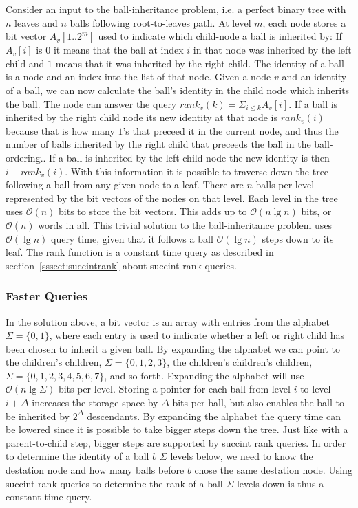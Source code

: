 Consider an input to the ball-inheritance problem, i.e. a perfect binary tree with $n$ leaves and $n$ balls following root-to-leaves path. At level $m$, each node stores a bit vector $A_v[1..2^m]$ used to indicate which child-node a ball is inherited by: If $A_v[i]$ is $0$ it means that the ball at index $i$ in that node was inherited by the left child and $1$ means that it was inherited by the right child. The identity of a ball is a node and an index into the list of that node. Given a node $v$ and an identity of a ball, we can now calculate the ball's identity in the child node which inherits the ball. The node can answer the query $rank_v(k) = \Sigma_{i \leq k} A_v[i]$. If a ball is inherited by the right child node its new identity at that node is $rank_v(i)$ because that is how many $1$'s that preceed it in the current node, and thus the number of balls inherited by the right child that preceeds the ball in the ball-ordering.. If a ball is inherited by the left child node the new identity is then $i-rank_v(i)$. With this information it is possible to traverse down the tree following a ball from any given node to a leaf. There are $n$ balls per level represented by the bit vectors of the nodes on that level. Each level in the tree uses $\mathcal{O}(n)$ bits to store the bit vectors. This adds up to $\mathcal{O}(n \lg n)$ bits, or $\mathcal{O}(n)$ words in all. This trivial solution to the ball-inheritance problem uses $\mathcal{O}(\lg n)$ query time, given that it follows a ball $\mathcal{O}(\lg n)$ steps down to its leaf. The rank function is a constant time query as described in section~\ref{sssect:succintrank} about succint rank queries.


\subsubsection{Faster Queries}
\label{ssection:fasterqueries}

In the solution above, a bit vector is an array with entries from the alphabet $\Sigma = \{0,1\}$, where each entry is used to indicate whether a left or right child has been chosen to inherit a given ball. By expanding the alphabet we can point to the children's children, $\Sigma = \{0,1,2,3\}$, the children's children's children, $\Sigma = \{0,1,2,3,4,5,6,7\}$, and so forth. Expanding the alphabet will use $\mathcal{O}(n \lg \Sigma)$ bits per level. Storing a pointer for each ball from level $i$ to level $i+\Delta$ increases the storage space by $\Delta$ bits per ball, but also enables the ball to be inherited by $2^\Delta$ descendants. By expanding the alphabet the query time can be lowered since it is possible to take bigger steps down the tree. Just like with a parent-to-child step, bigger steps are supported by succint rank queries. In order to determine the identity of a ball $b$ $\Sigma$ levels below, we need to know the destation node and how many balls before $b$ chose the same destation node. Using succint rank queries to determine the rank of a ball $\Sigma$ levels down is thus a constant time query.


